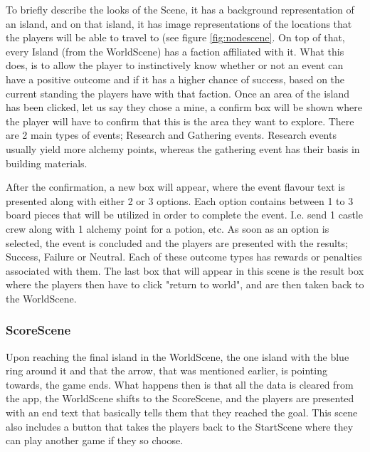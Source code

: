 To briefly describe the looks of the Scene, it has a background representation of an island, and on that island, it has image representations of the locations that the players will be able to travel to (see figure \ref{fig:nodescene}. On top of that, every Island (from the WorldScene) has a faction affiliated with it. What this does, is to allow the player to instinctively know whether or not an event can have a positive outcome and if it has a higher chance of success, based on the current standing the players have with that faction.
Once an area of the island has been clicked, let us say they chose a mine, a confirm box will be shown where the player will have to confirm that this is the area they want to explore. 
There are 2 main types of events; Research and Gathering events. Research events usually yield more alchemy points, whereas the gathering event has their basis in building materials.

After the confirmation, a new box will appear, where the event flavour text is presented along with either 2 or 3 options. Each option contains between 1 to 3 board pieces that will be utilized in order to complete the event. I.e. send 1 castle crew along with 1 alchemy point for a potion, etc. As soon as an option is selected, the event is concluded and the players are presented with the results; Success, Failure or Neutral. Each of these outcome types has rewards or penalties associated with them.
The last box that will appear in this scene is the result box where the players then have to click "return to world", and are then taken back to the WorldScene. 

\subsubsection{ScoreScene}
Upon reaching the final island in the WorldScene, the one island with the blue ring around it and that the arrow, that was mentioned earlier, is pointing towards, the game ends. 
What happens then is that all the data is cleared from the app, the WorldScene shifts to the ScoreScene, and the players are presented with an end text that basically tells them that they reached the goal. This scene also includes a button that takes the players back to the StartScene where they can play another game if they so choose.

